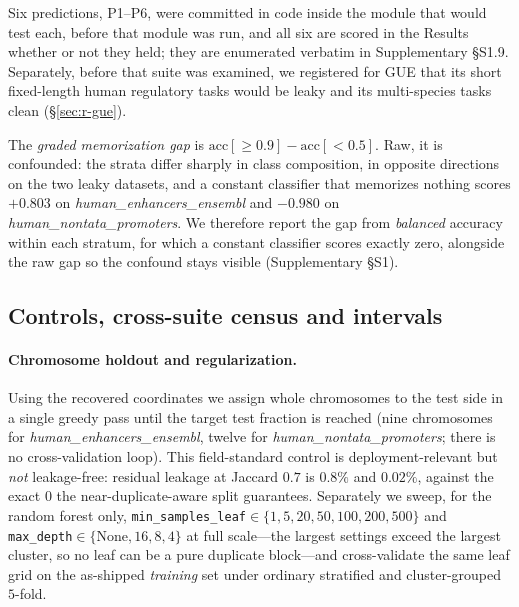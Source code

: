 \documentclass[webpdf,modern,large,namedate]{oup-authoring-template}%
\begin{document}
Six predictions, P1--P6, were committed in code inside the module that would test each,
before that module was run, and all six are scored in the Results whether or not they held; they are
enumerated verbatim in Supplementary \S S1.9. Separately, before that suite was examined, we
registered for GUE \citep{zhou2023dnabert2} that its short fixed-length human regulatory tasks would
be leaky and its multi-species tasks clean (\S\ref{sec:r-gue}).

The \emph{graded memorization gap} is $\mathrm{acc}[\ge0.9]-\mathrm{acc}[<0.5]$. Raw, it is confounded: the strata differ sharply in class composition, in opposite directions on the two leaky datasets, and a constant classifier that memorizes nothing scores $+0.803$ on \textit{human\_enhancers\_ensembl} and $-0.980$ on \textit{human\_nontata\_promoters}. We therefore report the gap from \emph{balanced} accuracy within each stratum, for which a constant classifier scores exactly zero, alongside the raw gap so the confound stays visible (Supplementary \S S1).

\subsection{Controls, cross-suite census and intervals}\label{sec:m-controls}
\paragraph{Chromosome holdout and regularization.} Using the recovered coordinates we assign whole chromosomes to the test side in a single greedy pass until the target test fraction is reached (nine chromosomes for \textit{human\_enhancers\_ensembl}, twelve for \textit{human\_nontata\_promoters}; there is no cross-validation loop). This field-standard control is deployment-relevant but \emph{not} leakage-free: residual leakage at Jaccard $0.7$ is $0.8\%$ and $0.02\%$, against the exact $0$ the near-duplicate-aware split guarantees. Separately we sweep, for the random forest only, \texttt{min\_samples\_leaf}$\in\{1,5,20,50,100,200,500\}$ and \texttt{max\_depth}$\in\{\text{None},16,8,4\}$ at full scale---the largest settings exceed the largest cluster, so no leaf can be a pure duplicate block---and cross-validate the same leaf grid on the as-shipped \emph{training} set under ordinary stratified and cluster-grouped $5$-fold.
\end{document}
